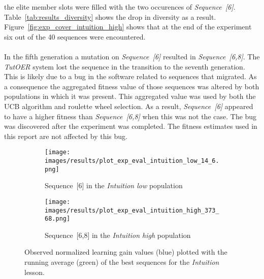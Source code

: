 the elite member slots were filled with the two occurences of
\emph{Sequence~[6]}. Table~\ref{tab:results_diversity} shows the drop in
diversity as a result. Figure~\ref{fig:exp_cover_intuition_high} shows that at
the end of the experiment six out of the 40 sequences were encountered.\\\\
\noindent
In the fifth generation a mutation on \emph{Sequence~[6]} resulted in
\emph{Sequence~[6,8]}. The \emph{TutOER} system lost the sequence in the
transition to the seventh generation. This is likely due to a bug in the
software related to sequences that migrated. As a consequence the aggregated
fitness value of those sequences was altered by both populations in which it
was present. This aggregated value was used by both the UCB algorithm and
roulette wheel selection. As a result, \emph{Sequence~[6]} appeared to have a
higher fitness than \emph{Sequence~[6,8]} when this was not the case. The bug
was discovered after the experiment was completed. The fitness estimates used
in this report are not affected by this bug.

\begin{figure}[ht]
	\begin{subfigure}{0.9\linewidth}
	\centering
	\texttt{[image: images/results/plot\_exp\_eval\_intuition\_low\_14\_6.png]}
	\caption{Sequence~[6] in the \emph{Intuition low} population}
	\label{fig:exp_eval_intuition_low_14}
	\end{subfigure}
	\hfill
	\begin{subfigure}{0.9\linewidth}
	\centering
	\texttt{[image: images/results/plot\_exp\_eval\_intuition\_high\_373\_68.png]}
	\caption{Sequence~[6,8] in the \emph{Intuition high} population}
	\label{fig:exp_eval_intuition_high_373}
	\end{subfigure}
	\caption{Observed normalized learning gain values (blue) plotted with the
		running average (green) of the best sequences for the \emph{Intuition}
	lesson.}
	\label{fig:exp_eval_intuition}
\end{figure}

